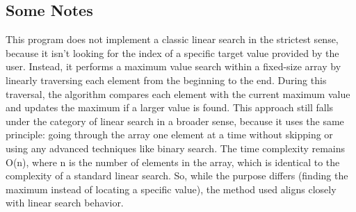 \documentclass{article}
\begin{document}
  \begin{multicols}{2}
    \subsection*{Some Notes}

    This program does not implement a classic linear search in the strictest sense, because it isn’t looking for the index of a specific target value provided by the user. Instead, it performs a maximum value search within a fixed-size array by linearly traversing each element from the beginning to the end. During this traversal, the algorithm compares each element with the current maximum value and updates the maximum if a larger value is found. This approach still falls under the category of linear search in a broader sense, because it uses the same principle: going through the array one element at a time without skipping or using any advanced techniques like binary search. The time complexity remains O(n), where n is the number of elements in the array, which is identical to the complexity of a standard linear search. So, while the purpose differs (finding the maximum instead of locating a specific value), the method used aligns closely with linear search behavior.
  \end{multicols}
\end{document}
